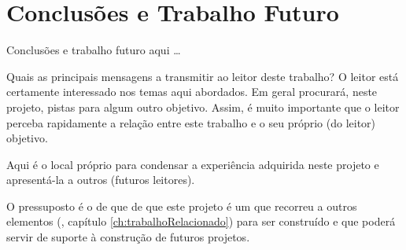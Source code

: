 \chapter{Conclusões e Trabalho Futuro}
\label{ch:conclusoesTrabalhoFuturo}

Conclusões e trabalho futuro aqui \ldots

Quais as principais mensagens a transmitir ao leitor deste trabalho? O leitor está certamente interessado nos temas aqui abordados. Em geral procurará, neste projeto, pistas para algum outro objetivo. Assim, é muito importante que o leitor perceba rapidamente a relação entre este trabalho e o seu próprio (do leitor) objetivo.

Aqui é o local próprio para condensar a experiência adquirida neste projeto e apresentá-la a outros (futuros leitores).

O pressuposto é o de que de que este projeto é um  que recorreu a outros elementos (\cf, capítulo \ref{ch:trabalhoRelacionado}) para ser construído e que poderá servir de suporte à construção de futuros projetos.








